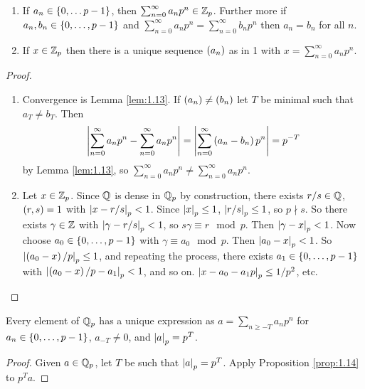 \begin{proposition}
\label{prop:1.14}
\hfill
\begin{enumerate}
\item If $ a_n \in \left\{ 0, \dots p - 1 \right\} $, then $ \sum_{n = 0}^\infty a_np^n \in \mathbb{Z}_p $. Further more if $ a_n, b_n \in \left\{ 0, \dots, p - 1 \right\} $ and $ \sum_{n = 0}^\infty a_np^n = \sum_{n = 0}^\infty b_np^n $ then $ a_n = b_n $ for all $ n $.
\item If $ x \in \mathbb{Z}_p $ then there is a unique sequence $ \left( a_n \right) $ as in 1 with $ x = \sum_{n = 0}^\infty a_np^n $.
\end{enumerate}
\end{proposition}

\begin{proof}
\hfill
\begin{enumerate}
\item Convergence is Lemma \ref{lem:1.13}. If $ \left( a_n \right) \ne \left( b_n \right) $ let $ T $ be minimal such that $ a_T \ne b_T $. Then
$$ \left\lvert \sum_{n = 0}^\infty a_np^n - \sum_{n = 0}^\infty a_np^n \right\rvert = \left\lvert \sum_{n = 0}^\infty \left( a_n - b_n \right)p^n \right\rvert = p^{-T} $$
by Lemma \ref{lem:1.13}, so $ \sum_{n = 0}^\infty a_np^n \ne \sum_{n = 0}^\infty a_np^n $.
\item Let $ x \in \mathbb{Z}_p $. Since $ \mathbb{Q} $ is dense in $ \mathbb{Q}_p $ by construction, there exists $ r / s \in \mathbb{Q} $, $ \left( r, s \right) = 1 $ with $ \left\lvert x - r / s \right\rvert_p < 1 $. Since $ \left\lvert x \right\rvert_p \le 1 $, $ \left\lvert r / s \right\rvert_p \le 1 $, so $ p \nmid s $. So there exists $ \gamma \in \mathbb{Z} $ with $ \left\lvert \gamma - r / s \right\rvert_p < 1 $, so $ s\gamma \equiv r \mod p $. Then $ \left\lvert \gamma - x \right\rvert_p < 1 $. Now choose $ a_0 \in \left\{ 0, \dots, p - 1 \right\} $ with $ \gamma \equiv a_0 \mod p $. Then $ \left\lvert a_0 - x \right\rvert_p < 1 $. So $ \left\lvert \left( a_0 - x \right) / p \right\rvert_p \le 1 $, and repeating the process, there exists $ a_1 \in \left\{ 0, \dots, p - 1 \right\} $ with $ \left\lvert \left( a_0 - x \right) / p - a_1 \right\rvert_p < 1 $, and so on. $ \left\lvert x - a_0 - a_1p \right\rvert_p \le 1 / p^2 $, etc.
\end{enumerate}
\end{proof}


\begin{corollary}
Every element of $ \mathbb{Q}_p $ has a unique expression as $ a = \sum_{n \ge -T} a_np^n $ for $ a_n \in \left\{ 0, \dots, p - 1 \right\} $, $ a_{-T} \ne 0 $, and $ \left\lvert a \right\rvert_p = p^T $.
\end{corollary}

\begin{proof}
Given $ a \in \mathbb{Q}_p $, let $ T $ be such that $ \left\lvert a \right\rvert_p = p^T $. Apply Proposition \ref{prop:1.14} to $ p^Ta $.
\end{proof}

